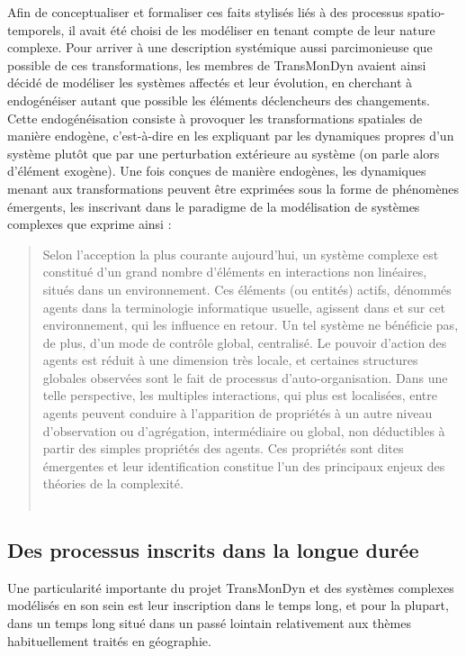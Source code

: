 Afin de conceptualiser et formaliser ces faits stylisés liés à des processus spatio-temporels, il avait été choisi de les modéliser en tenant compte de leur nature complexe.
Pour arriver à une description systémique aussi parcimonieuse que possible de ces transformations, les membres de TransMonDyn avaient ainsi décidé de modéliser les systèmes affectés et leur évolution, en cherchant à \og endogénéiser\fg{} autant que possible les éléments déclencheurs des changements.
Cette endogénéisation consiste à provoquer les transformations spatiales de manière endogène, c'est-à-dire en les expliquant par les dynamiques propres d'un système plutôt que par une perturbation extérieure au système (on parle alors d'élément exogène).
Une fois conçues de manière endogènes, les dynamiques menant aux transformations peuvent être exprimées sous la forme de phénomènes émergents, les inscrivant dans le paradigme de la modélisation de systèmes complexes que  exprime ainsi :
\begin{quotation}
\noindent \og Selon l'acception la plus courante aujourd'hui, un système complexe est constitué d'un grand nombre d'éléments en interactions non linéaires, situés dans un environnement.
Ces éléments (ou entités) actifs, dénommés agents dans la terminologie informatique usuelle, agissent dans et sur cet environnement, qui les influence en retour.
Un tel système ne bénéficie pas, de plus, d'un mode de contrôle global, centralisé.
Le pouvoir d'action des agents est réduit à une dimension très locale, et certaines structures globales observées sont le fait de processus d'auto-­organisation.
Dans une telle perspective, les multiples interactions, qui plus est localisées, entre agents peuvent conduire à l'apparition de propriétés à un autre niveau d'observation ou d'agrégation, intermédiaire ou global, non déductibles à partir des simples propriétés des agents.
Ces propriétés sont dites émergentes et leur identification constitue l'un des principaux enjeux des théories de la complexité. 
\fg{}\\
\mbox{}~ \hfill \cite[39-40]{banos_pour_2013}  
\end{quotation}

\subsection{Des processus inscrits dans la longue durée}

Une particularité importante du projet TransMonDyn et des systèmes complexes modélisés en son sein est leur inscription dans le temps long, et pour la plupart, dans un temps long situé dans un passé lointain relativement aux thèmes habituellement traités en géographie.

